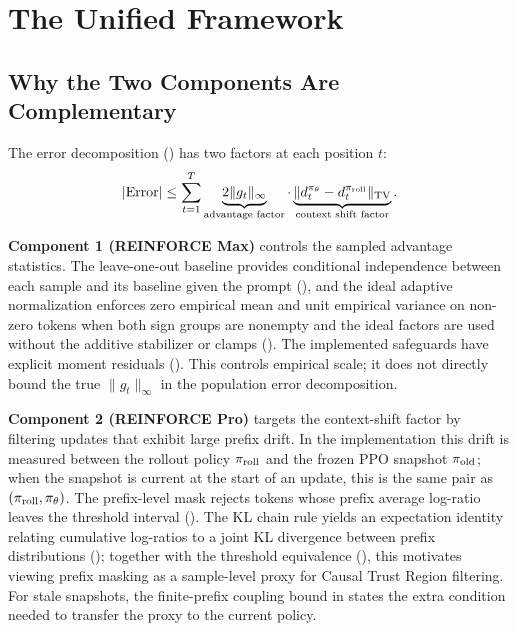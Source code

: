 \section{The Unified Framework}
\label{sec:unified}

\subsection{Why the Two Components Are Complementary}

The error decomposition () has two factors at each position $t$:
\begin{equation*}
    |\mathrm{Error}| \le \sum_{t=1}^T \underbrace{2\|g_t\|_\infty}_{\text{advantage factor}} \cdot \underbrace{\|d_t^{\pi_{\theta}} - d_t^{\pi_{\mathrm{roll}}}\|_{\mathrm{TV}}}_{\text{context shift factor}}.
\end{equation*}

\textbf{Component 1 (REINFORCE Max)} controls the sampled advantage statistics. The leave-one-out baseline provides conditional independence between
each sample and its baseline given the prompt (), and the ideal adaptive normalization enforces zero empirical mean and unit empirical
variance on non-zero tokens when both sign groups are nonempty and the ideal factors are used without the additive stabilizer or clamps
(). The implemented safeguards have explicit moment residuals ().
This controls empirical scale; it does not directly bound the true $\|g_t\|_\infty$ in the population error decomposition.

\textbf{Component 2 (REINFORCE Pro)} targets the context-shift factor by filtering updates that exhibit large prefix drift. In the
implementation this drift is measured between the rollout policy $\pi_{\mathrm{roll}}$ and the
frozen PPO snapshot $\pi_{\mathrm{old}}$; when the snapshot is current at the start of an
update, this is the same pair as $(\pi_{\mathrm{roll}},\pi_{\theta})$. The prefix-level mask
rejects tokens whose prefix average log-ratio leaves the threshold interval
(). The KL chain rule yields an expectation
identity relating cumulative log-ratios to a joint KL divergence between prefix
distributions (); together with the threshold equivalence
(), this motivates viewing prefix masking as a
sample-level proxy for Causal Trust Region filtering. For stale snapshots, the
finite-prefix coupling bound in  states the extra condition
needed to transfer the proxy to the current policy.

